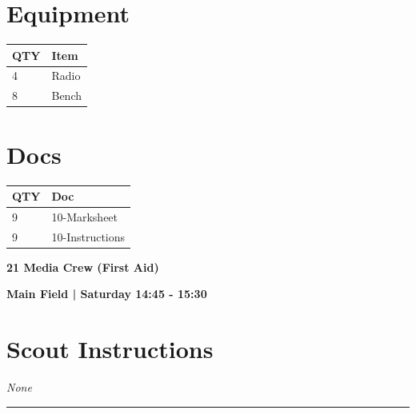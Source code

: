 \documentclass[10pt]{article}
\newcommand{\newtitle}[1]{\begin{center}{\Huge\bfseries #1 }\\ \vspace{5mm}\end{center}}
\newcommand{\newsubtitle}[1]{\begin{center}{\color{grey}\Large\bfseries #1 }\\ \vspace{5mm}\end{center}}
\begin{document}
	\begin{multicols}{2}

		\section*{\faWrench \: Equipment}

		
	\begin{center}
			\begin{tabular}{p{2cm}p{4cm}}


				\textbf{QTY} & \textbf{Item} \\\toprule
												4&Radio\\\midrule
												8&Bench\\\midrule
								\end{tabular}

			\end{center}

		
		\vfill\null
		\columnbreak

			\section*{\faFile \: Docs}
		 	\begin{center}
			\begin{tabular}{p{2cm}p{4cm}}

			\textbf{QTY} & \textbf{Doc} \\\toprule
										9&10-Marksheet\\\midrule
										9&10-Instructions\\\midrule
							\end{tabular}
			\end{center}
	

		\vfill\null

		\end{multicols}



	\vspace{1cm}


	\clearpage
		\newtitle{21 Media Crew (First Aid) }
	\newsubtitle{Main Field | Saturday 14:45 - 15:30}
		\setcounter{section}{20}
	\section*{Scout Instructions}
		\textit{None}
	
	\vspace{0.5cm}
	\hrule
	\vspace{0.5cm}
\end{document}
